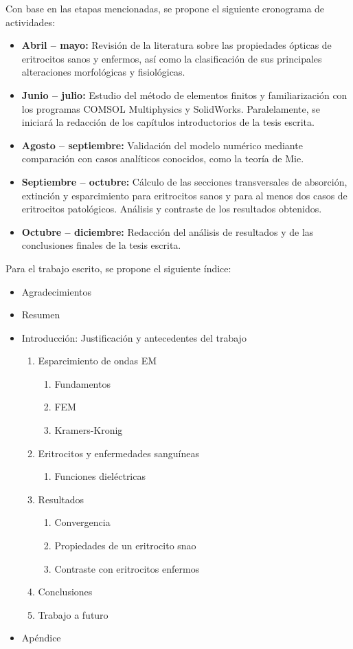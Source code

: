 \documentclass[11pt,letterpaper]{article}
\begin{document}
	Con base en las etapas mencionadas, se propone el siguiente cronograma de actividades:
	
	\begin{itemize} 
		\item \textbf{Abril – mayo:} Revisión de la literatura sobre las propiedades ópticas de eritrocitos sanos y enfermos, así como la clasificación de sus principales alteraciones morfológicas y fisiológicas.
		\item \textbf{Junio – julio:} Estudio del método de elementos finitos y familiarización con los programas COMSOL Multiphysics y SolidWorks. Paralelamente, se iniciará la redacción de los capítulos introductorios de la tesis escrita.
		
		\item \textbf{Agosto – septiembre:} Validación del modelo numérico mediante comparación con casos analíticos conocidos, como la teoría de Mie.
		
		\item \textbf{Septiembre – octubre:} Cálculo de las secciones transversales de absorción, extinción y esparcimiento para eritrocitos sanos y para al menos dos casos de eritrocitos patológicos. Análisis y contraste de los resultados obtenidos.
		
		\item \textbf{Octubre – diciembre:} Redacción del análisis de resultados y de las conclusiones finales de la tesis escrita.
	\end{itemize}
	

	Para el trabajo escrito, se propone el siguiente índice:
	\begin{itemize}
		\item [] Agradecimientos
		\item [] Resumen
		\item [] Introducción: Justificación y antecedentes del trabajo
		\begin{enumerate}
			\item Esparcimiento de ondas EM
			\begin{enumerate}
				\item Fundamentos
				\item FEM
				\item Kramers-Kronig
			\end{enumerate}
			\item Eritrocitos y enfermedades sanguíneas
			\begin{enumerate}
				\item Funciones dieléctricas
			\end{enumerate}
			\item Resultados
			\begin{enumerate}
				\item Convergencia
				\item Propiedades de un eritrocito snao
				\item  Contraste con eritrocitos enfermos
			\end{enumerate}
			\item Conclusiones
			\item Trabajo a futuro	
		\end{enumerate}
		\item[] Apéndice
	\end{itemize}
	
\end{document}
